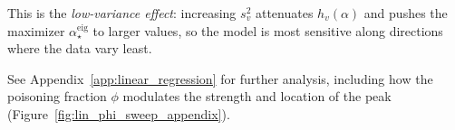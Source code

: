 \documentclass[11pt]{article}
\newcommand{\I}{\mathbf{I}}
\newcommand{\C}{\mathbf{C}}
\newcommand{\bmu}{\boldsymbol{\mu}}
\newtheorem{remark}{Remark}
\begin{document}


This is the \emph{low-variance effect}: increasing \(s_v^2\) attenuates \(h_v(\alpha)\) and pushes the maximizer \(\alpha_\star^{\mathrm{eig}}\) to larger values, so the model is most sensitive along directions where the data vary least.



See Appendix~\ref{app:linear_regression} for further analysis, including how the poisoning fraction \(\phi\) modulates the strength and location of the peak (Figure~\ref{fig:lin_phi_sweep_appendix}).


\end{document}

